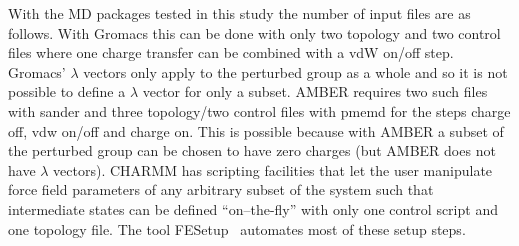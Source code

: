 \documentclass[journal=jctcce,manuscript=suppinfo]{achemso}
\begin{document}
With the MD packages tested in this study the number of input files
are as follows.  With Gromacs this can be done with only two topology
and two control files where one charge transfer can be combined with a
vdW on/off step.  Gromacs' $\lambda$ vectors only apply to the
perturbed group as a whole and so it is not possible to define a
$\lambda$ vector for only a subset.  AMBER requires two such files
with sander and three topology/two control files with pmemd for the
steps charge off, vdw on/off and charge on.  This is possible because
with AMBER a subset of the perturbed group can be chosen to have zero
charges (but AMBER does not have $\lambda$ vectors).  CHARMM has
scripting facilities that let the user manipulate force field
parameters of any arbitrary subset of the system such that
intermediate states can be defined ``on--the-fly'' with only one
control script and one topology file.  The tool
FESetup~\cite{loeffler_fesetup:_2015} automates most of these setup
steps.


\end{document}
